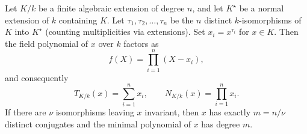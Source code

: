 Let $K/k$ be a finite algebraic extension of degree $n$, and let $K^\star$ be a normal extension of $k$ containing $K$. Let $\tau_1, \tau_2, \dots, \tau_n$ be the $n$ distinct $k$-isomorphisms of $K$ into $K^\star$ (counting multiplicities via extensions). Set $x_i = x^{\tau_i}$ for $x \in K$. Then the field polynomial of $x$ over $k$ factors as
$$f(X) = \prod_{i=1}^{n} (X - x_i),$$
and consequently
$$T_{K/k}(x) = \sum_{i=1}^{n} x_i, \qquad N_{K/k}(x) = \prod_{i=1}^{n} x_i.$$
If there are $\nu$ isomorphisms leaving $x$ invariant, then $x$ has exactly $m = n/\nu$ distinct conjugates and the minimal polynomial of $x$ has degree $m$.
